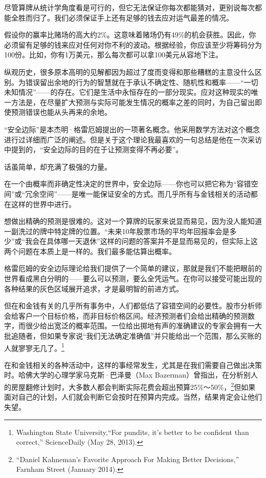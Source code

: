 {\kaishu

尽管算牌从统计学角度看是可行的，但它无法保证你每次都能猜对，更别说每次都能全胜而归了。我们必须保证手上还有足够的钱去应对运气最差的情况。

假设你的赢率比赌场的高大约2\%。这意味着赌场仍有49\%的机会获胜。因此，你必须留有足够的钱来应对任何对你不利的波动。根据经验，你应该至少将筹码分为100份。比如，你有1万美元，那么每次都可以拿100美元从容地下注。

}

纵观历史，很多原本高明的见解都因为超过了度而变得和那些糟糕的主意没什么区别。为错误留出余地的行为的智慧就在于承认不确定性、随机性和概率——“一切未知情况”——的存在。它们是生活中永恒存在的一部分现实。应对这种现实的唯一方法是，在尽量扩大预测与实际可能发生情况的概率之差的同时，为自己留出即使预测错误也能从头再来的余地。

“安全边际”是本杰明·格雷厄姆提出的一项著名概念。他采用数学方法对这个概念进行过详细而广泛的阐述。但是关于这个理论我最喜欢的一句总结是他在一次采访中提到的，“安全边际的目的在于让预测变得不再必要”。

话虽简单，却充满了极强的力量。

在一个由概率而非确定性决定的世界中，安全边际——你也可以把它称为“容错空间”或“冗余空间”——是唯一能保证安全的方式。而几乎所有与金钱相关的活动都在这样的世界中进行。

想做出精确的预测是很难的。这对一个算牌的玩家来说显而易见，因为没人能知道一副洗过的牌中特定牌的位置。“未来10年股票市场的平均年回报率会是多少”或“我会在具体哪一天退休”这样的问题的答案并不是显而易见的，但实际上这两个问题在本质上是一样的。我们最多能估算出概率。

格雷厄姆的安全边际理论给我们提供了一个简单的建议，那就是我们不能把眼前的世界看成黑白分明的——要么可以预测，要么全凭运气。在你可以接受可能出现的各种结果的灰色区域展开追求，才是最明智的前进方式。

但在和金钱有关的几乎所有事务中，人们都低估了容错空间的必要性。股市分析师会给客户一个目标价格，而非目标价格区间。经济预测者们会给出精确的预测数字，而很少给出宽泛的概率范围。一位给出掷地有声的准确建议的专家会拥有一大批追随者，但如果专家说“我们无法确定准确值”并只能给出一个范围，那么买账的人就寥寥无几了。\footnote{Washington State University,“For pundits, it’s better to be confident than correct,” ScienceDaily (May 28, 2013).}

在和金钱相关的各种活动中，这样的事经常发生，尤其是在我们需要自己做出决策时。哈佛大学的心理学家马克斯·巴泽曼（Max Bazerman）曾指出，在分析别人的房屋翻修计划时，大多数人都会判断实际花费会超出预算25\%～50\%，\footnote{“Daniel Kahneman’s Favorite Approach For Making Better Decisions,” Farnham Street (January 2014).}但如果面对自己的计划，人们就会判断它会按时在预算内完成。当然，结果肯定会让他们失望。

